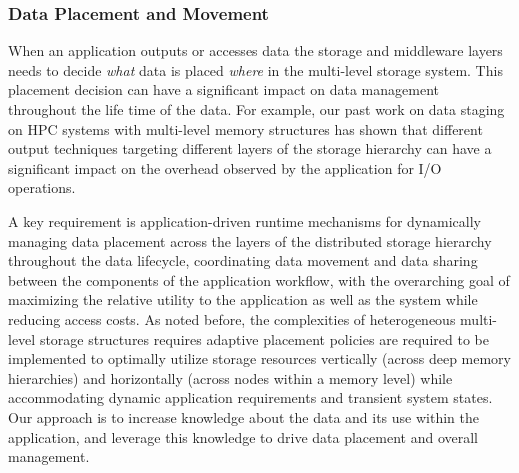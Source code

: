\subsubsection{Data Placement and Movement}
\label{sec:init-plac-data}
When an application outputs or accesses data the storage and middleware layers needs to
decide \textit{what} data is placed \textit{where} in the multi-level storage system. 
This placement decision can have a significant impact on data management 
throughout the life time of the data. For example, our past work on data 
staging~\cite{tongipdps15,qiansc15,docan2012dataspaces,abbasi2010datastager} 
on HPC systems with multi-level memory structures has shown that different 
output techniques targeting different layers of the storage hierarchy can have a 
significant impact on the overhead observed by the application for I/O operations. 


A key requirement is application-driven runtime mechanisms for dynamically managing 
data placement across the layers of the distributed storage hierarchy throughout the 
data lifecycle, coordinating data movement and data sharing between the components 
of the application workflow, with the overarching goal of maximizing the relative utility 
to the application as well as the system while reducing access costs. 
%
As noted before, the complexities of heterogeneous multi-level storage structures requires 
adaptive placement policies are required to be implemented to optimally utilize storage 
resources vertically (across deep memory hierarchies) and horizontally (across nodes 
within a memory level) while accommodating dynamic application requirements and transient 
system states. 
%
Our approach is to increase knowledge about the data and its use within the 
application, and leverage this knowledge to drive data placement and overall management. 


